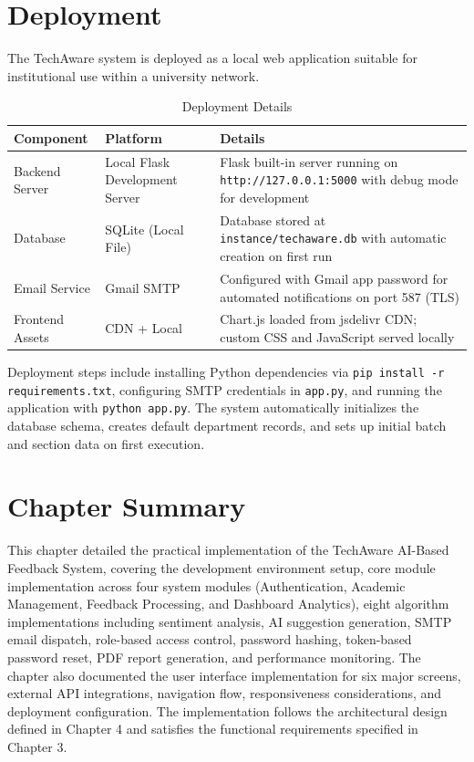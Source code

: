 
\section{Deployment}

The TechAware system is deployed as a local web application suitable for institutional use within a university network.

\begin{table}[H]
\centering
\caption{Deployment Details}
\begin{tabularx}{\textwidth}{|p{3cm}|p{3cm}|X|}
\hline
\textbf{Component} & \textbf{Platform} & \textbf{Details} \\
\hline
Backend Server & Local Flask Development Server & Flask built-in server running on \texttt{http://127.0.0.1:5000} with debug mode for development \\
\hline
Database & SQLite (Local File) & Database stored at \texttt{instance/techaware.db} with automatic creation on first run \\
\hline
Email Service & Gmail SMTP & Configured with Gmail app password for automated notifications on port 587 (TLS) \\
\hline
Frontend Assets & CDN + Local & Chart.js loaded from jsdelivr CDN; custom CSS and JavaScript served locally \\
\hline
\end{tabularx}
\end{table}

Deployment steps include installing Python dependencies via \texttt{pip install -r requirements.txt}, configuring SMTP credentials in \texttt{app.py}, and running the application with \texttt{python app.py}. The system automatically initializes the database schema, creates default department records, and sets up initial batch and section data on first execution.


\section{Chapter Summary}

This chapter detailed the practical implementation of the TechAware AI-Based Feedback System, covering the development environment setup, core module implementation across four system modules (Authentication, Academic Management, Feedback Processing, and Dashboard Analytics), eight algorithm implementations including sentiment analysis, AI suggestion generation, SMTP email dispatch, role-based access control, password hashing, token-based password reset, PDF report generation, and performance monitoring. The chapter also documented the user interface implementation for six major screens, external API integrations, navigation flow, responsiveness considerations, and deployment configuration. The implementation follows the architectural design defined in Chapter 4 and satisfies the functional requirements specified in Chapter 3.

